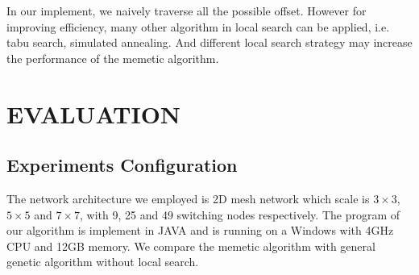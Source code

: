 \documentclass[journal]{IEEEtran}
\begin{document}
In our implement,
 we naively traverse all the possible offset.
However for improving efficiency,
 many other algorithm in local search can be applied,
  i.e. tabu search, simulated annealing.
And different local search strategy may increase the performance of the memetic algorithm.

\section{EVALUATION\label{s:evalu}}

\subsection{Experiments Configuration}






The network architecture we employed is 2D mesh network which scale is $3\times 3$, $5\times 5$ and $7\times 7$,
 with 9, 25 and 49 switching nodes respectively.
The program of our algorithm is implement in JAVA and is running on a Windows with 4GHz CPU and 12GB memory.
We compare the memetic algorithm with general genetic algorithm without local search. 
\end{document}
